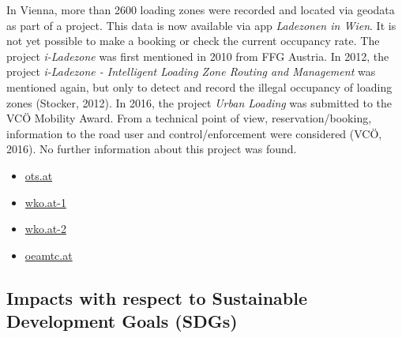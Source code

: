 \documentclass[
]{book}
\providecommand{\tightlist}{%
  \setlength{\itemsep}{0pt}\setlength{\parskip}{0pt}}
\begin{document}
In Vienna, more than 2600 loading zones were recorded and located via geodata as part of a project. This data is now available via app \emph{Ladezonen in Wien}. It is not yet possible to make a booking or check the current occupancy rate. The project \emph{i-Ladezone} was first mentioned in 2010 from FFG Austria. In 2012, the project \emph{i-Ladezone - Intelligent Loading Zone Routing and Management} was mentioned again, but only to detect and record the illegal occupancy of loading zones (Stocker, 2012). In 2016, the project \emph{Urban Loading} was submitted to the VCÖ Mobility Award. From a technical point of view, reservation/booking, information to the road user and control/enforcement were considered (VCÖ, 2016). No further information about this project was found.

\begin{itemize}
\tightlist
\item
  \href{https://www.ots.at/presseaussendung/OTS_20150123_OTS0044/simple-stressfreie-ladezonensuche-wk-wien-praesentiert-neue-app}{ots.at}
\item
  \href{https://www.wko.at/service/verkehr-betriebsstandort/Ladezonen-Nutzung.html}{wko.at-1}
\item
  \href{https://www.wko.at/service/w/verkehr-betriebsstandort/ladezone-wien-app.html}{wko.at-2}
\item
  \href{https://www2.ffg.at/verkehr/projekte.php?id=805\&lang=de\&browse=programm}{oeamtc.at}
\end{itemize}

\hypertarget{impacts-with-respect-to-sustainable-development-goals-sdgs-32}{%
\subsection*{Impacts with respect to Sustainable Development Goals (SDGs)}\label{impacts-with-respect-to-sustainable-development-goals-sdgs-32}}
\end{document}
